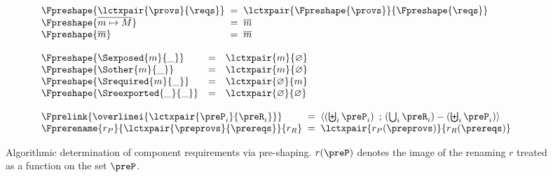 \begin{figure}
\[\begin{array}{@{}l}
  \begin{array}{l@{\;\;=\;\;}l}
    \Fpreshape{\lctxpair{\provs}{\reqs}}
    & \lctxpair{\Fpreshape{\provs}}{\Fpreshape{\reqs}} \\
    \Fpreshape{\overline{m \mapsto M}} & \overline{m} \\
    \Fpreshape{\overline{m}} & \overline{m} \\
  \end{array} \\
  \\

  \begin{array}{l@{\quad=\quad}l}
    \Fpreshape{\Sexposed{m}{\_}}%
    & \lctxpair{m}{\varnothing} \\
    \Fpreshape{\Sother{m}{\_}}%
    & \lctxpair{m}{\varnothing} \\
    \Fpreshape{\Srequired{m}{\_}}%
    & \lctxpair{\varnothing}{m} \\
    \Fpreshape{\Sreexported{\_}{\_}}%
    & \lctxpair{\varnothing}{\varnothing} \\
  \end{array} \\
  \\

  \begin{array}{l@{\;\;=\;\;}l}
    \Fprelink{\overlinei{\lctxpair{\preP_i}{\preR_i}}}
    & \left\langle
        \left(\biguplus_i \preP_i\right)
        ~;\,
        \left(\bigcup_i \preR_i\right)
          -
          \left(\biguplus_i \preP_i\right)
      \right\rangle \\
    \Fprerename{r_P}{\lctxpair{\preprovs}{\prereqs}}{r_R}
    & \lctxpair{r_P(\preprovs)}{r_R(\prereqs)} \\
  \end{array} \\

\end{array}
\]

\caption{ Algorithmic determination of component requirements via pre-shaping.
$r(\preP)$ denotes the image of the renaming $r$ treated as a function
on the set $\preP$.}
\label{fig:pre-shaping}
\end{figure}


